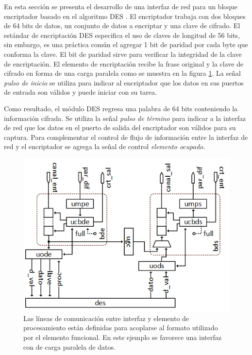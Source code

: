 En esta sección se presenta el desarrollo de una interfaz de red para un bloque encriptador basado en el algoritmo DES \cite{chapter0:NIST:1977:DES}. El encriptador trabaja con dos bloques de 64 bits de datos, un conjunto de datos a encriptar y una clave de cifrado. El estándar de encriptación DES especifica el uso de claves de longitud de 56 bits, sin embargo, es una práctica común el agregar 1 bit de paridad por cada byte que conforma la clave. El bit de paridad sirve para verificar la integridad de la clave de encriptación.
El elemento de encriptación recibe la frase original y la clave de cifrado en forma de una carga paralela como se muestra en la figura \ref{fig:ch4_interfaz_des}. La señal \textit{pulso de inicio} se utiliza para indicar al encriptador que los datos en sus puertos de entrada son válidos y puede iniciar con su tarea.

Como resultado, el módulo DES regresa una palabra de 64 bits conteniendo la información cifrada. Se utiliza la señal \textit{pulso de término} para indicar a la interfaz de red que los datos en el puerto de salida del encriptador son válidos para su captura. Para complementar el control de flujo de información entre la interfaz de red y el encriptador se agrega la señal de control \textit{elemento ocupado}.


\begin{figure}
	\begin{center}
		\includegraphics[scale = 0.8]{figures/ch4_interfaz_des.png}
	\end{center}
	\caption
		{	
			Las líneas de comunicación entre interfaz y elemento de procesamiento están definidas para acoplarse al formato utilizado por el elemento funcional. En este ejemplo se favorece una interfaz con de carga paralela de datos.
		}
	\label{fig:ch4_interfaz_des}
\end{figure}

